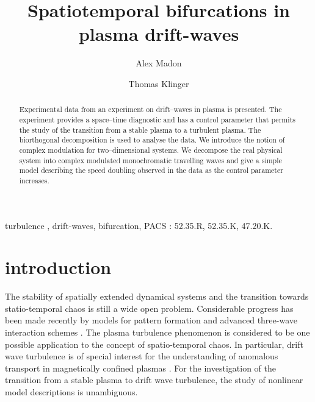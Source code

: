 \begin{frontmatter}

\title {Spatiotemporal bifurcations in plasma drift-waves}
\author {Alex Madon}
\address {CNRS, Centre de Physique Th\'eorique, Luminy,
         Case 907, F-13288 Marseille, France, 
         madon@cpt.univ-mrs.fr}
\author{Thomas Klinger}
\address{Institut f\"ur Experimentalphysik, 
Christian-Albrechts-Universit\"at,
Kiel, Olshausenstrasse 40-60, D-24098 Kiel, Germany}

\begin{abstract}
Experimental data from an experiment on drift--waves in plasma
is presented. The experiment provides a space--time diagnostic and
has a control parameter that permits the study of the transition
from a stable plasma to a turbulent plasma. 
The biorthogonal decomposition is used to analyse the data.
We introduce the notion of complex modulation for two--dimensional
systems. We decompose the real physical system into complex
modulated monochromatic travelling waves and give a simple model
describing the speed doubling observed in the data as the control
parameter increases.
\end{abstract}

\begin{keyword}turbulence , drift-waves, 
bifurcation,
PACS : 52.35.R, 52.35.K, 47.20.K.
\end{keyword}

\end{frontmatter}


\section{introduction}

The stability of spatially extended dynamical systems and the transition
towards statio-temporal chaos is still a wide open problem. Considerable
progress has been made recently by models for pattern formation
\cite{hohenberg93} and advanced three-wave interaction schemes 
\cite{chow95,kaup79}. The plasma turbulence phenomenon \cite{tsytovich}
is considered to be
one possible application to the concept of spatio-temporal chaos.  
In particular, drift wave turbulence is of 
special interest for the understanding of anomalous transport 
in magnetically confined plasmas \cite{horton84}. For the investigation 
of the transition from a stable plasma to drift wave turbulence, 
the study of nonlinear model 
descriptions is unambiguous\cite{horton90}. 

